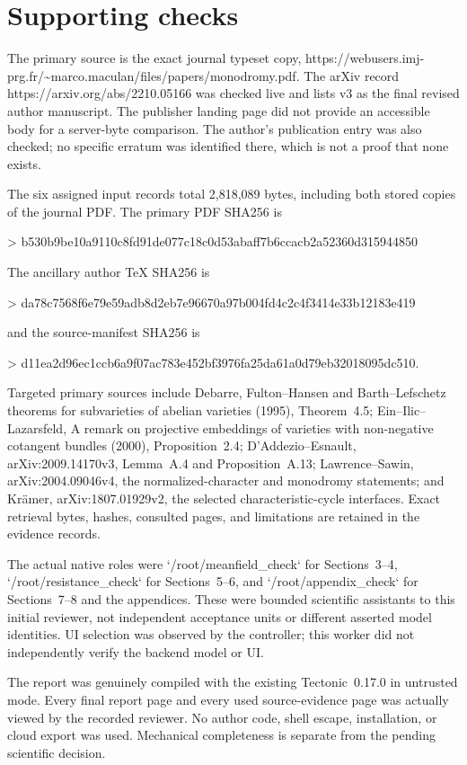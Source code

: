 \documentclass[10pt]{article}
\begin{document}
\section*{Supporting checks}
The primary source is the exact journal typeset copy, https://webusers.imj-prg.fr/\textasciitilde{}marco.maculan/files/papers/monodromy.pdf. The arXiv record https://arxiv.org/abs/2210.05166 was checked live and lists v3 as the final revised author manuscript. The publisher landing page did not provide an accessible body for a server-byte comparison. The author’s publication entry was also checked; no specific erratum was identified there, which is not a proof that none exists.\par
The six assigned input records total 2,818,089 bytes, including both stored copies of the journal PDF. The primary PDF SHA256 is\par
> b530b9be10a9110c8fd91de077c18c0d53abaff7b6ccacb2a52360d315944850\par
The ancillary author TeX SHA256 is\par
> da78c7568f6e79e59adb8d2eb7e96670a97b004fd4c2c4f3414e33b12183e419\par
and the source-manifest SHA256 is\par
> d11ea2d96ec1ccb6a9f07ac783e452bf3976fa25da61a0d79eb32018095dc510.\par
Targeted primary sources include Debarre, Fulton–Hansen and Barth–Lefschetz theorems for subvarieties of abelian varieties (1995), Theorem 4.5; Ein–Ilic–Lazarsfeld, A remark on projective embeddings of varieties with non-negative cotangent bundles (2000), Proposition 2.4; D’Addezio–Esnault, arXiv:2009.14170v3, Lemma A.4 and Proposition A.13; Lawrence–Sawin, arXiv:2004.09046v4, the normalized-character and monodromy statements; and Krämer, arXiv:1807.01929v2, the selected characteristic-cycle interfaces. Exact retrieval bytes, hashes, consulted pages, and limitations are retained in the evidence records.\par
The actual native roles were `/root/meanfield\_check` for Sections 3–4, `/root/resistance\_check` for Sections 5–6, and `/root/appendix\_check` for Sections 7–8 and the appendices. These were bounded scientific assistants to this initial reviewer, not independent acceptance units or different asserted model identities. UI selection was observed by the controller; this worker did not independently verify the backend model or UI.\par
The report was genuinely compiled with the existing Tectonic 0.17.0 in untrusted mode. Every final report page and every used source-evidence page was actually viewed by the recorded reviewer. No author code, shell escape, installation, or cloud export was used. Mechanical completeness is separate from the pending scientific decision.\par
\end{document}
